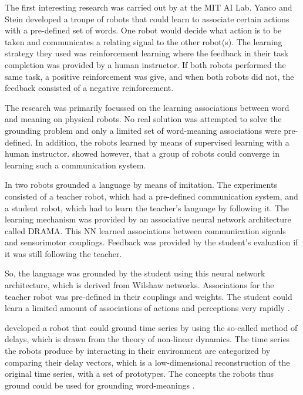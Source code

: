 \p
The first interesting research was carried out by  at the MIT AI Lab. Yanco and Stein developed a troupe of robots that could learn to associate certain actions with a pre-defined set of words. One robot would decide what action is to be taken and communicates a relating signal to the other robot(s). The learning strategy they used was reinforcement learning where the feedback in their task completion was provided by a human instructor. If both robots performed the same task, a positive reinforcement was give, and when both robots did not, the feedback consisted of a negative reinforcement.

The research was primarily focussed on the learning associations between word and meaning on physical robots. No real solution was attempted to solve the grounding problem and only a limited set of word-meaning associations were pre-defined. In addition, the robots learned by means of supervised learning with a human instructor.  showed however, that a group of robots could converge in learning such a communication system.

\p
In  two robots grounded a language by means of imitation. The experiments consisted of a teacher robot, which had a pre-defined communication system, and a student robot, which had to learn the teacher's language by following it. The learning mechanism was provided by an associative neural network architecture called DRAMA. This NN learned associations between communication signals and sensorimotor couplings. Feedback was provided by the student's evaluation if it was still following the teacher.

So, the language was grounded by the student using this neural network architecture, which is derived from Wilshaw networks. Associations for the teacher robot was pre-defined in their couplings and weights. The student could learn a limited amount of associations of actions and perceptions very rapidly \cite{billard:1998}.

\p
{} developed a robot that could ground time series by using the so-called method of delays, which is drawn from the theory of non-linear dynamics. The time series the robots produce by interacting in their environment are categorized by comparing their delay vectors, which is a low-dimensional reconstruction of the original time series, with a set of prototypes. The concepts the robots thus ground could be used for grounding word-meanings \cite{rosenstein:1998b}.

